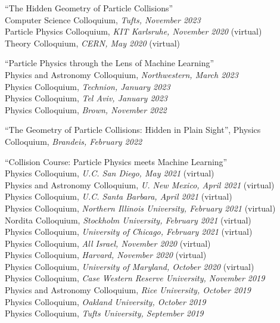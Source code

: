\bbl

\item ``The Hidden Geometry of Particle Collisions''
\\ Computer Science Colloquium, \emph{Tufts, November 2023}
\\ Particle Physics Colloquium, \emph{KIT Karlsruhe, November 2020} (virtual)
\\ Theory Colloquium, \emph{CERN, May 2020} (virtual)

\item ``Particle Physics through the Lens of Machine Learning''
\\ Physics and Astronomy Colloquium, \emph{Northwestern, March 2023}
\\ Physics Colloquium, \emph{Technion, January 2023}
\\ Physics Colloquium, \emph{Tel Aviv, January 2023}
\\ Physics Colloquium, \emph{Brown, November 2022}

\item ``The Geometry of Particle Collisions: Hidden in Plain Sight'', Physics Colloquium, \emph{Brandeis, February 2022}

\item ``Collision Course:  Particle Physics meets Machine Learning''
\\ Physics Colloquium, \emph{U.C. San Diego, May 2021} (virtual)
\\ Physics and Astronomy Colloquium, \emph{U. New Mexico, April 2021} (virtual)
\\ Physics Colloquium, \emph{U.C. Santa Barbara, April 2021} (virtual)
\\ Physics Colloquium, \emph{Northern Illinois University, February 2021} (virtual)
\\ Nordita Colloquium, \emph{Stockholm University, February 2021} (virtual)
\\ Physics Colloquium, \emph{University of Chicago, February 2021} (virtual)
\\ Physics Colloquium, \emph{All Israel, November 2020} (virtual)
\\ Physics Colloquium, \emph{Harvard, November 2020} (virtual)
\\ Physics Colloquium, \emph{University of Maryland, October 2020} (virtual)
\\ Physics Colloquium, \emph{Case Western Reserve University, November 2019}
\\ Physics and Astronomy Colloquium, \emph{Rice University, October 2019}
\\ Physics Colloquium, \emph{Oakland University, October 2019}
\\ Physics Colloquium, \emph{Tufts University, September 2019}

